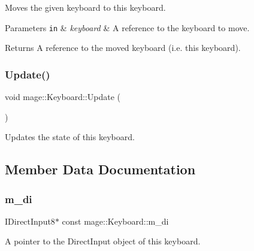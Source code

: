 Moves the given keyboard to this keyboard.


\begin{DoxyParams}[1]{Parameters}
\mbox{\tt in}  & {\em keyboard} & A reference to the keyboard to move. \\
\hline
\end{DoxyParams}
\begin{DoxyReturn}{Returns}
A reference to the moved keyboard (i.\+e. this keyboard). 
\end{DoxyReturn}
\hypertarget{classmage_1_1_keyboard_abb5fd91a304f8bbf8b15ab1a277dafaf}{}\label{classmage_1_1_keyboard_abb5fd91a304f8bbf8b15ab1a277dafaf} 
\subsubsection{\texorpdfstring{Update()}{Update()}}
{\footnotesize\ttfamily void mage\+::\+Keyboard\+::\+Update (\begin{DoxyParamCaption}{ }\end{DoxyParamCaption})}

Updates the state of this keyboard. 

\subsection{Member Data Documentation}
\hypertarget{classmage_1_1_keyboard_a627eeef05bae81a60c2c44fd039ff7f8}{}\label{classmage_1_1_keyboard_a627eeef05bae81a60c2c44fd039ff7f8} 
\subsubsection{\texorpdfstring{m\+\_\+di}{m\_di}}
{\footnotesize\ttfamily I\+Direct\+Input8$\ast$ const mage\+::\+Keyboard\+::m\+\_\+di\hspace{0.3cm}{\ttfamily [private]}}

A pointer to the Direct\+Input object of this keyboard. \hypertarget{classmage_1_1_keyboard_a4a9e80f99dfea8ac518fb451965d4047}{}\label{classmage_1_1_keyboard_a4a9e80f99dfea8ac518fb451965d4047} 
